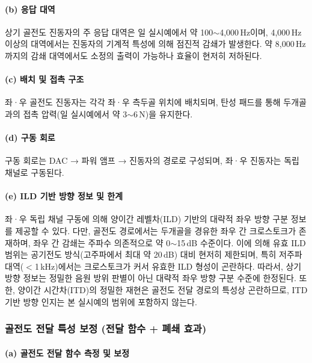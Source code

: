 \documentclass{article}
\begin{document}
\paragraph{(b) 응답 대역}

상기 골전도 진동자의 주 응답 대역은 일 실시예에서 약 100$\sim$4{,}000\,Hz이며, 4{,}000\,Hz 이상의 대역에서는 진동자의 기계적 특성에 의해 점진적 감쇄가 발생한다. 약 8{,}000\,Hz까지의 감쇄 대역에서도 소정의 출력이 가능하나 효율이 현저히 저하된다.

\paragraph{(c) 배치 및 접촉 구조}

좌·우 골전도 진동자는 각각 좌·우 측두골 위치에 배치되며, 탄성 패드를 통해 두개골과의 접촉 압력(일 실시예에서 약 3$\sim$6\,N)을 유지한다.

\paragraph{(d) 구동 회로}

구동 회로는 DAC → 파워 앰프 → 진동자의 경로로 구성되며, 좌·우 진동자는 독립 채널로 구동된다.

\paragraph{(e) ILD 기반 방향 정보 및 한계}

좌·우 독립 채널 구동에 의해 양이간 레벨차(ILD) 기반의 대략적 좌우 방향 구분 정보를 제공할 수 있다. 다만, 골전도 경로에서는 두개골을 경유한 좌우 간 크로스토크가 존재하며, 좌우 간 감쇄는 주파수 의존적으로 약 0$\sim$15\,dB 수준이다. 이에 의해 유효 ILD 범위는 공기전도 방식(고주파에서 최대 약 20\,dB) 대비 현저히 제한되며, 특히 저주파 대역($<$1\,kHz)에서는 크로스토크가 커서 유효한 ILD 형성이 곤란하다. 따라서, 상기 방향 정보는 정밀한 음원 방위 판별이 아닌 대략적 좌우 방향 구분 수준에 한정된다. 또한, 양이간 시간차(ITD)의 정밀한 재현은 골전도 전달 경로의 특성상 곤란하므로, ITD 기반 방향 인지는 본 실시예의 범위에 포함하지 않는다.

\subsubsection{골전도 전달 특성 보정 (전달 함수 + 폐쇄 효과)}

\paragraph{(a) 골전도 전달 함수 측정 및 보정}
\end{document}
